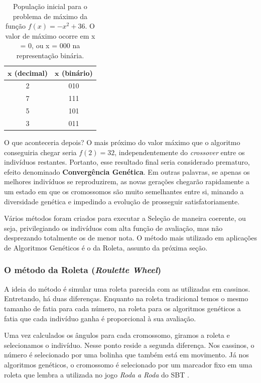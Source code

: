\begin{table}[htp]
		\caption{\label{tabFuncMax}População inicial para o problema de máximo da função $f(x) = -x^2 + 36$. O valor de máximo ocorre em x = 0, ou x = 000 na representação binária.}
		\begin{center}
			\begin{tabular}{c|c}
				\hline
				$\textbf{x}$ (decimal)		& $\textbf{x}$ (binário) \\
				\hline
				2							& 010 \\
				7							& 111 \\
				5							& 101 \\	
				3							& 011 \\
				\hline
			\end{tabular}
		\end{center}
	\end{table}
		
		O que aconteceria depois? O mais próximo do valor máximo que o algoritmo conseguiria chegar seria $f(2) = 32$, independentemente do \textit{crossover} entre os indivíduos restantes. Portanto, esse resultado final seria considerado prematuro, efeito denominado \textbf{Convergência Genética}. Em outras palavras, se apenas os melhores indivíduos se reproduzirem, as novas gerações chegarão rapidamente a um estado em que os cromossomos são muito semelhantes entre si, minando a diversidade genética e impedindo a evolução de prosseguir satisfatoriamente.
		
		Vários métodos foram criados para executar a Seleção de maneira coerente, ou seja, privilegiando os indivíduos com alta função de avaliação, mas não desprezando totalmente os de menor nota. O método mais utilizado em aplicações de Algoritmos Genéticos é o da Roleta, assunto da próxima seção.
	
	\subsubsection{O método da Roleta (\textit{Roulette Wheel})}
	
	A ideia do método é simular uma roleta parecida com as utilizadas em cassinos. Entretando, há duas diferenças. Enquanto na roleta tradicional temos o mesmo tamanho de fatia para cada número, na roleta para os algoritmos genéticos a fatia que cada indivíduo ganha é proporcional à sua avaliação.
	
	Uma vez calculados os ângulos para cada cromossomo, giramos a roleta e selecionamos o indivíduo. Nesse ponto reside a segunda diferença. Nos cassinos, o número é selecionado por uma bolinha que também está em movimento. Já nos algoritmos genéticos, o cromossomo é selecionado por um marcador fixo em uma roleta que lembra a utilizada no jogo \textit{Roda a Roda} do SBT \cite{roda-a-roda}.
	

